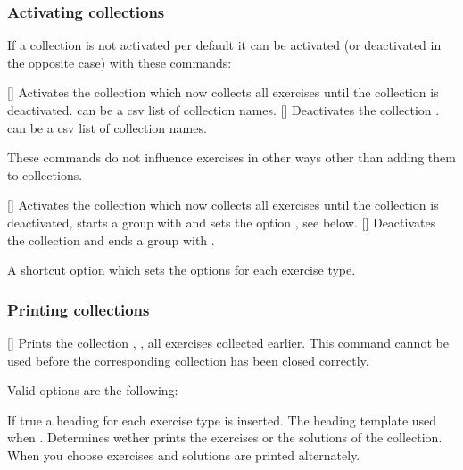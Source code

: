 \documentclass{xsim-manual}
\begin{document}
\subsubsection{Activating collections}
If a collection is not activated per default it can be activated (or
deactivated in the opposite case) with these commands:
\begin{commands}
  []
    Activates the collection  which
    now collects all exercises until the collection is
    deactivated.  can be a csv list of collection
    names.
  []
    Deactivates the collection .
     can be a csv list of collection names.
\end{commands}
These commands do not influence exercises in other ways other than adding them
to collections.
\begin{commands}
  []
    Activates the collection  which now collects all
    exercises until the collection is deactivated, starts a group with
     and sets the option , see below.
  []
    Deactivates the collection  and ends a group with
    .
\end{commands}
\begin{options}
    A shortcut option which sets the options
    \code{/} for each exercise type.
\end{options}

\subsubsection{Printing collections}
\begin{commands}
  []
    Prints the collection , \ie, all exercises collected
    earlier.  This command cannot be used before the corresponding collection
    has been closed correctly.
\end{commands}
Valid options are the following:
\begin{options}
    If true a heading for each exercise type is inserted.
    The heading template used when .
    Determines wether  prints the exercises or the
    solutions of the collection.  When you choose  exercises and
    solutions are printed alternately.
\end{options}
\end{document}
